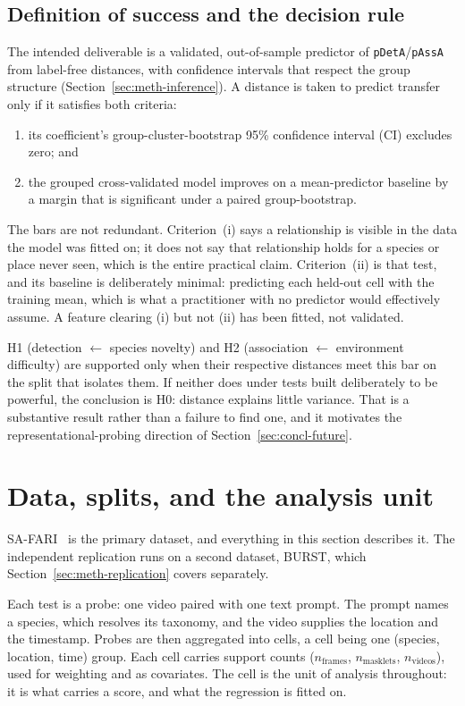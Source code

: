 \subsection{Definition of success and the decision rule}
\label{sec:meth-success}
The intended deliverable is a validated, out-of-sample predictor of \texttt{pDetA}/\texttt{pAssA} from
label-free distances, with confidence intervals that respect the group structure
(Section~\ref{sec:meth-inference}). A distance is taken to predict transfer only if it satisfies both criteria:
\begin{enumerate}[label=(\roman*),leftmargin=2.4em]
  \item its coefficient's group-cluster-bootstrap 95\% confidence interval (CI) excludes zero; and
  \item the grouped cross-validated model improves on a mean-predictor baseline by a margin that is significant under
    a paired group-bootstrap.
\end{enumerate}
The bars are not redundant. Criterion~(i) says a relationship is visible in the data the model was fitted on;
it does not say that relationship holds for a species or place never seen, which is the entire practical claim.
Criterion~(ii) is that test, and its baseline is deliberately minimal: predicting each held-out cell with the
training mean, which is what a practitioner with no predictor would effectively assume. A feature clearing (i)
but not (ii) has been fitted, not validated.

H1 (detection $\leftarrow$ species novelty) and H2 (association $\leftarrow$ environment difficulty) are
supported only when their respective distances meet this bar on the split that isolates them. If neither does
under tests built deliberately to be powerful, the conclusion is H0: distance explains little variance. That is
a substantive result rather than a failure to find one, and it motivates the representational-probing direction
of Section~\ref{sec:concl-future}.

\section{Data, splits, and the analysis unit}
\label{sec:meth-data}
SA-FARI~\cite{safari} is the primary dataset, and everything in this section describes it. The independent
replication runs on a second dataset, BURST, which Section~\ref{sec:meth-replication} covers separately.

Each test is a probe: one video paired with one text prompt. The prompt names a species, which resolves its
taxonomy, and the video supplies the location and the timestamp. Probes are then aggregated into cells, a cell
being one (species, location, time) group. Each cell carries support counts ($n_\text{frames}$,
$n_\text{masklets}$, $n_\text{videos}$), used for weighting and as covariates. The cell is the unit of
analysis throughout: it is what carries a score, and what the regression is fitted on.

